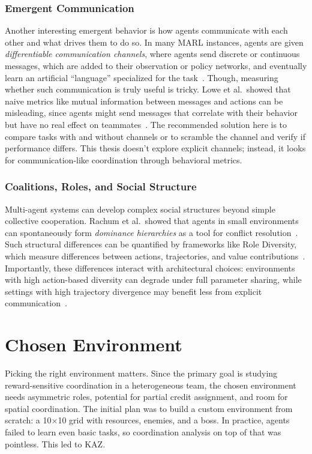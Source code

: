 \subsection{Emergent Communication}
Another interesting emergent behavior is how agents communicate with each other and what drives them to do so. In many MARL instances, agents are given \emph{differentiable communication channels}, where agents send discrete or continuous messages, which are added to their observation or policy networks, and eventually learn an artificial ``language'' specialized for the task~\cite{lazaridou2020emergent}. 
Though, measuring whether such communication is truly useful is tricky. Lowe et al.\ showed that naive metrics like mutual information between messages and actions can be misleading, since agents might send messages that correlate with their behavior but have no real effect on teammates~\cite{lowe2019pitfalls}. The recommended solution here is to compare tasks with and without channels or to scramble the channel and verify if performance differs. This thesis doesn't explore explicit channels; instead, it looks for communication-like coordination through behavioral metrics.

\subsection{Coalitions, Roles, and Social Structure}
Multi-agent systems can develop complex social structures beyond simple collective cooperation. Rachum et al.\ showed that agents in small environments can spontaneously form \emph{dominance hierarchies} as a tool for conflict resolution~\cite{rachum2024dominance}. Such structural differences can be quantified by frameworks like Role Diversity, which measure differences between actions, trajectories, and value contributions~\cite{hu2022policy}. Importantly, these differences interact with architectural choices: environments with high action-based diversity can degrade under full parameter sharing, while settings with high trajectory divergence may benefit less from explicit communication~\cite{hu2022policy}.

\chapter{Chosen Environment}
\label{chap:environment}

Picking the right environment matters. Since the primary goal is studying reward-sensitive coordination in a heterogeneous team, the chosen environment needs asymmetric roles, potential for partial credit assignment, and room for spatial coordination.
The initial plan was to build a custom environment from scratch: a 10$\times$10 grid with resources, enemies, and a boss. In practice, agents failed to learn even basic tasks, so coordination analysis on top of that was pointless. This led to KAZ.

